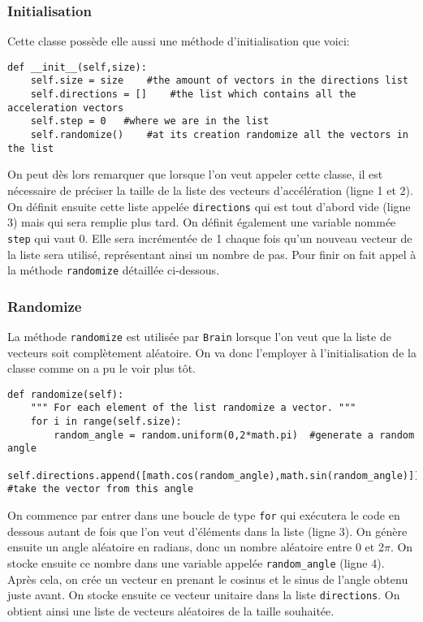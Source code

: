 \documentclass[12pt, a4paper, openany]{book}
\begin{document}
\subsubsection{Initialisation}
Cette classe possède elle aussi une méthode d'initialisation que voici:
\begin{verbatim}
def __init__(self,size):
	self.size = size	#the amount of vectors in the directions list
	self.directions = []	#the list which contains all the acceleration vectors
	self.step = 0	#where we are in the list
	self.randomize()	#at its creation randomize all the vectors in the list
\end{verbatim}
On peut dès lors remarquer que lorsque l'on veut appeler cette classe, il est nécessaire de préciser la taille de la liste des vecteurs d'accélération (ligne 1 et 2). On définit ensuite cette liste appelée \verb'directions' qui est tout d'abord vide (ligne 3) mais qui sera remplie plus tard. On définit également une variable nommée \verb'step' qui vaut 0. Elle sera incrémentée de 1 chaque fois qu'un nouveau vecteur de la liste sera utilisé, représentant ainsi un nombre de \og pas\fg{}. Pour finir on fait appel à la méthode \verb'randomize' détaillée ci-dessous.

\subsubsection{Randomize}
La méthode \verb'randomize' est utilisée par \verb'Brain' lorsque l'on veut que la liste de vecteurs soit complètement aléatoire. On va donc l'employer à l'initialisation de la classe comme on a pu le voir plus tôt.
\begin{verbatim}
def randomize(self):
	""" For each element of the list randomize a vector. """
	for i in range(self.size):
		random_angle = random.uniform(0,2*math.pi)	#generate a random angle
		self.directions.append([math.cos(random_angle),math.sin(random_angle)])	#take the vector from this angle
\end{verbatim}
On commence par entrer dans une boucle de type \verb'for' qui exécutera le code en dessous autant de fois que l'on veut d’éléments dans la liste (ligne 3). On génère ensuite un angle aléatoire en radians, donc un nombre aléatoire entre 0 et 2$\pi$. On stocke ensuite ce nombre dans une variable appelée \verb'random_angle' (ligne 4). Après cela, on crée un vecteur en prenant le cosinus et le sinus de l'angle obtenu juste avant. On stocke ensuite ce vecteur unitaire dans la liste \verb'directions'. On obtient ainsi une liste de vecteurs aléatoires de la taille souhaitée.
\end{document}
